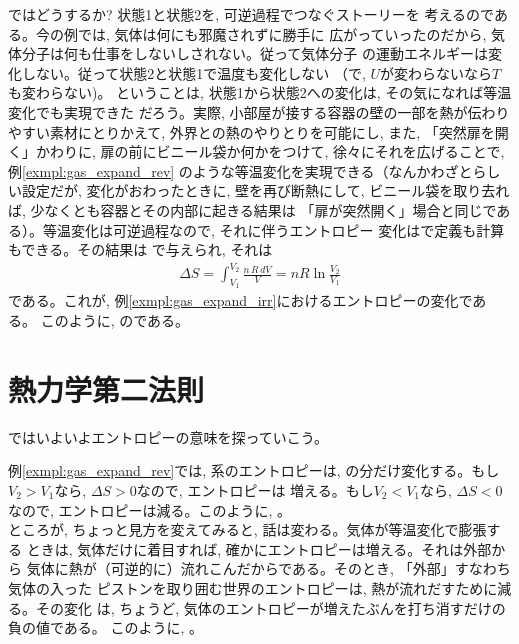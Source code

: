 ではどうするか? 状態1と状態2を, 可逆過程でつなぐストーリーを
考えるのである。今の例では, 気体は何にも邪魔されずに勝手に
広がっていったのだから, 気体分子は何も仕事をしないしされない。従って気体分子
の運動エネルギーは変化しない。従って状態2と状態1で温度も変化しない
（で, $U$が変わらないなら$T$も変わらない)。
ということは, 状態1から状態2への変化は, その気になれば等温変化でも実現できた
だろう。実際, 小部屋が接する容器の壁の一部を熱が伝わりやすい素材にとりかえて, 
外界との熱のやりとりを可能にし, また, 「突然扉を開く」かわりに, 
扉の前にビニール袋か何かをつけて, 徐々にそれを広げることで, 例\ref{exmpl:gas_expand_rev} 
のような等温変化を実現できる（なんかわざとらしい設定だが, 変化がおわったときに, 
壁を再び断熱にして, ビニール袋を取り去れば, 少なくとも容器とその内部に起きる結果は
「扉が突然開く」場合と同じである）。等温変化は可逆過程なので, それに伴うエントロピー
変化はで定義も計算もできる。その結果は
で与えられ, それは
\begin{eqnarray}
\Delta S=\int_{V_1}^{V_2} \frac{n\,R\,dV}{V}=nR\ln\frac{V_2}{V_1}\label{eq:entropy_expand}
\end{eqnarray}
である。これが, 例\ref{exmpl:gas_expand_irr}におけるエントロピーの変化である。
このように, のである。\\

\section{熱力学第二法則}

ではいよいよエントロピーの意味を探っていこう。

例\ref{exmpl:gas_expand_rev}では, 系のエントロピーは, 
の分だけ変化する。もし$V_2>V_1$なら, $\Delta S>0$なので, エントロピーは
増える。もし$V_2<V_1$なら, $\Delta S<0$なので, エントロピーは減る。このように, 
。\\

ところが, ちょっと見方を変えてみると, 話は変わる。気体が等温変化で膨張する
ときは, 気体だけに着目すれば, 確かにエントロピーは増える。それは外部から
気体に熱が（可逆的に）流れこんだからである。そのとき, 「外部」すなわち気体の入った
ピストンを取り囲む世界のエントロピーは, 熱が流れだすために減る。その変化
は, ちょうど, 気体のエントロピーが増えたぶんを打ち消すだけの負の値である。
このように, 。
\mv


